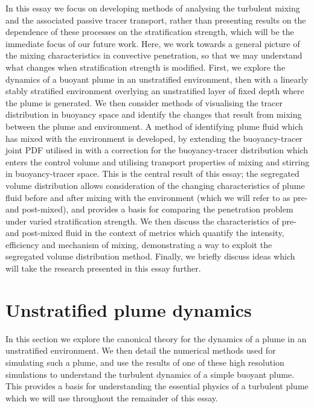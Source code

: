 \documentclass[a4paper]{article}
\begin{document}
In this essay we focus on developing methods of analysing the turbulent mixing and the
associated passive tracer transport, rather than presenting results on the dependence of these processes on the
stratification strength, which will be the immediate focus of our future work. Here, we work towards a general
picture of the mixing characteristics in convective penetration, so that we may understand what changes when
stratification strength is modified. First, we explore the dynamics of a
buoyant plume in an unstratified environment, then with a linearly stably stratified environment overlying an
unstratified layer of fixed depth where the plume is generated. We then consider methods of visualising the
tracer distribution in buoyancy space and identify the changes that result from mixing between the plume and
environment. A method of identifying plume fluid which has mixed with the environment is developed, by
extending the buoyancy-tracer joint PDF utilised in \citet{penney2020} with a correction for the buoyancy-tracer
distribution which enters the control volume and utilising transport properties of mixing and stirring in
buoyancy-tracer space. This is the central result of this essay; the segregated volume distribution
allows consideration of the changing characteristics of plume fluid before and after mixing with the
environment (which we will refer to as pre- and post-mixed), and provides a basis for comparing the
penetration problem under varied stratification strength. We then discuss the characteristics of pre- and
post-mixed fluid in the context of metrics which quantify the intensity, efficiency and mechanism of mixing,
demonstrating a way to exploit the segregated volume distribution method. Finally, we briefly discuss ideas
which will take the research presented in this essay further.


\section{Unstratified plume dynamics}

In this section we explore the canonical theory for the dynamics of a plume in an unstratified environment. We
then detail the numerical methods used for simulating such a plume, and use the results of one of these high
resolution simulations to understand the turbulent dynamics of a simple buoyant plume. This provides a basis
for understanding the essential physics of a turbulent plume which we will use throughout the remainder of
this essay. 
\end{document}
